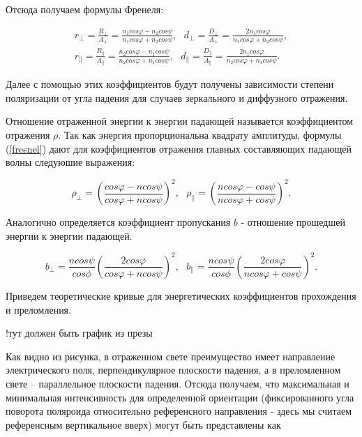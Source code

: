 \documentclass[a4paper]{article}
\begin{document}
Отсюда получаем формулы Френеля:

\begin{equation}
\begin{gathered}

r_{\perp} = \frac{R_{\perp}}{A_{\perp}} = \frac{n_1 cos\varphi - n_2 cos\psi}{n_1 cos\varphi + n_2 cos\psi}, \text{     } 

d_{\perp} = \frac{D_{\perp}}{A_{\perp}} = \frac{2 n_1 cos\varphi}{n_1 cos\varphi + n_2 cos\psi}, \\


r_{\parallel} = \frac{R_{\parallel}}{A_{\parallel}} = \frac{n_2 cos\varphi - n_1 cos\psi}{n_2 cos\varphi + n_1 cos\psi}, \text{     }

d_{\parallel} = \frac{D_{\parallel}}{A_{\parallel}} = \frac{2 n_1 cos\varphi}{n_2 cos\varphi + n_1 cos\psi}.

\end{gathered}

\label{fresnel}
\end{equation}

Далее с помощью этих коэффициентов будут получены зависимости степени поляризации от угла падения для случаев зеркального и диффузного отражения.


Отношение отраженной энергии к энергии падающей называется коэффициентом отражения $\rho$. Так как энергия пропорциональна квадрату амплитуды, формулы (\ref{fresnel}) дают для коэффициентов отражения главных составляющих падающей волны следуюшие выражения:

\begin{equation}
\rho_{\perp} = (\frac{cos\varphi - ncos\psi}{cos\varphi + ncos\psi})^2,\text{     } \rho_{\parallel} = (\frac{ncos\varphi - cos\psi}{ncos\varphi+cos\psi})^2.
\end{equation}

Аналогично определяется коэффициент пропускания $b$ - отношение прошедшей энергии к энергии падающей.

\begin{equation}
b_{\perp} = \frac{ncos\psi}{cos\phi}(\frac{2cos\varphi}{cos\varphi + ncos\psi})^2,\text{     } b_{\parallel} = \frac{ncos\psi}{cos\phi}(\frac{2cos\varphi}{ncos\varphi+cos\psi})^2.
\end{equation}

Приведем теоретические кривые для энергетических коэффициентов прохождения и преломления.

!тут должен быть график из презы

Как видно из рисунка, в отраженном свете преимущество имеет направление электрического поля, перпендикулярное плоскости
падения, а в преломленном свете – параллельное плоскости падения. Отсюда получаем, что максимальная и минимальная интенсивность для определенной ориентации (фиксированного угла поворота поляроида относительно референсного направления - здесь мы считаем референсным вертикальное вверх) могут быть представлены как
\end{document}
